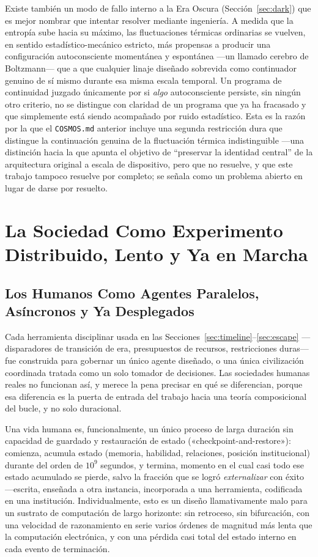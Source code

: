 \documentclass[11pt]{article}
\begin{document}
Existe también un modo de fallo interno a la Era Oscura (Sección~\ref{sec:dark}) que es mejor nombrar que intentar resolver mediante ingeniería. A medida que la entropía sube hacia su máximo, las fluctuaciones térmicas ordinarias se vuelven, en sentido estadístico-mecánico estricto, más propensas a producir una configuración autoconsciente momentánea y espontánea —un llamado cerebro de Boltzmann— que a que cualquier linaje diseñado sobrevida como continuador genuino de sí mismo durante esa misma escala temporal. Un programa de continuidad juzgado únicamente por si \emph{algo} autoconsciente persiste, sin ningún otro criterio, no se distingue con claridad de un programa que ya ha fracasado y que simplemente está siendo acompañado por ruido estadístico. Esta es la razón por la que el \texttt{COSMOS.md} anterior incluye una segunda restricción dura que distingue la continuación genuina de la fluctuación térmica indistinguible —una distinción hacia la que apunta el objetivo de ``preservar la identidad central'' de la arquitectura original a escala de dispositivo, pero que no resuelve, y que este trabajo tampoco resuelve por completo; se señala como un problema abierto en lugar de darse por resuelto.

\section{La Sociedad Como Experimento Distribuido, Lento y Ya en Marcha}
\label{sec:society}

\subsection{Los Humanos Como Agentes Paralelos, Asíncronos y Ya Desplegados}

Cada herramienta disciplinar usada en las Secciones~\ref{sec:timeline}--\ref{sec:escape} —disparadores de transición de era, presupuestos de recursos, restricciones duras— fue construida para gobernar un único agente diseñado, o una única civilización coordinada tratada como un solo tomador de decisiones. Las sociedades humanas reales no funcionan así, y merece la pena precisar en qué se diferencian, porque esa diferencia es la puerta de entrada del trabajo hacia una teoría composicional del bucle, y no solo duracional.

Una vida humana es, funcionalmente, un único proceso de larga duración sin capacidad de guardado y restauración de estado («checkpoint-and-restore»): comienza, acumula estado (memoria, habilidad, relaciones, posición institucional) durante del orden de $10^9$ segundos, y termina, momento en el cual casi todo ese estado acumulado se pierde, salvo la fracción que se logró \emph{externalizar} con éxito —escrita, enseñada a otra instancia, incorporada a una herramienta, codificada en una institución. Individualmente, esto es un diseño llamativamente malo para un sustrato de computación de largo horizonte: sin retroceso, sin bifurcación, con una velocidad de razonamiento en serie varios órdenes de magnitud más lenta que la computación electrónica, y con una pérdida casi total del estado interno en cada evento de terminación.
\end{document}
